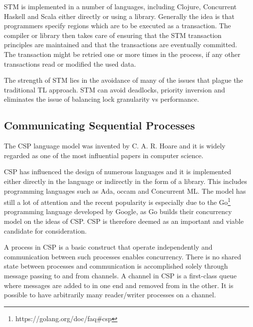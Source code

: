 \ac{STM} is implemented in a number of languages, including Clojure\cite[p. 101]{sevenModels}, Concurrent Haskell\cite{harris2005composable} and Scala\cite{goodman2011muts} either directly or using a library. Generally the idea is that programmers specify regions which are to be executed as a transaction. The compiler or library then takes care of ensuring that the \ac{STM} transaction principles are maintained and that the transactions are eventually committed\cite[p. 1]{saha2006mcrt}. The transaction might be retried one or more times in the process, if any other transactions read or modified the used data.

The strength of \ac{STM} lies in the avoidance of many of the issues that plague the traditional \ac{TL} approach. \ac{STM} can avoid deadlocks, priority inversion and eliminates the issue of balancing lock granularity vs performance\cite[p. 1]{harris2005composable}.

\subsection{Communicating Sequential Processes}
The \ac{CSP} language model was invented by C. A. R. Hoare and it is widely regarded as one of the most influential papers in computer science\cite{abdallah2005communicating}. 

\ac{CSP} has influenced the design of numerous languages and it is implemented either directly in the language or indirectly in the form of a library. This includes programming languages such as Ada, occam and Concurrent ML\cite{abdallah2005communicating}. The model has still a lot of attention and the recent popularity is especially due to the Go\footnote{https://golang.org/doc/faq\#csp} programming language developed by Google, as Go builds their concurrency model on the ideas of \ac{CSP}\cite[Chap. 6]{sevenModels}. \ac{CSP} is therefore deemed as an important and viable candidate for consideration.

A process in \ac{CSP} is a basic construct that operate independently and communication between such processes enables concurrency\cite{ibmCSP}. There is no shared state between processes and communication is accomplished solely through message passing to and from channels. A channel in \ac{CSP} is a first-class queue where messages are added to in one end and removed from in the other\cite[Chap. 6]{sevenModels}. It is possible to have arbitrarily many reader/writer processes on a channel. 

